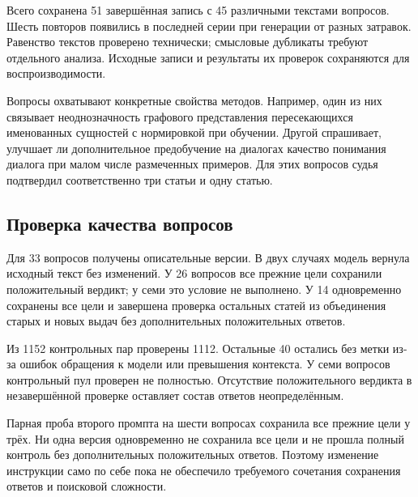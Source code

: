 Всего сохранена 51 завершённая запись с 45 различными текстами вопросов. Шесть повторов появились в последней серии при генерации от разных затравок. Равенство текстов проверено технически; смысловые дубликаты требуют отдельного анализа. Исходные записи и результаты их проверок сохраняются для воспроизводимости.

Вопросы охватывают конкретные свойства методов. Например, один из них связывает неоднозначность графового представления пересекающихся именованных сущностей с нормировкой при обучении. Другой спрашивает, улучшает ли дополнительное предобучение на диалогах качество понимания диалога при малом числе размеченных примеров. Для этих вопросов судья подтвердил соответственно три статьи и одну статью.

\subsection{Проверка качества вопросов}\label{sec:question-quality}

Для 33 вопросов получены описательные версии. В двух случаях модель вернула исходный текст без изменений. У 26 вопросов все прежние цели сохранили положительный вердикт; у семи это условие не выполнено. У 14 одновременно сохранены все цели и завершена проверка остальных статей из объединения старых и новых выдач без дополнительных положительных ответов.

Из 1152 контрольных пар проверены 1112. Остальные 40 остались без метки из-за ошибок обращения к модели или превышения контекста. У семи вопросов контрольный пул проверен не полностью. Отсутствие положительного вердикта в незавершённой проверке оставляет состав ответов неопределённым.

Парная проба второго промпта на шести вопросах сохранила все прежние цели у трёх. Ни одна версия одновременно не сохранила все цели и не прошла полный контроль без дополнительных положительных ответов. Поэтому изменение инструкции само по себе пока не обеспечило требуемого сочетания сохранения ответов и поисковой сложности.

